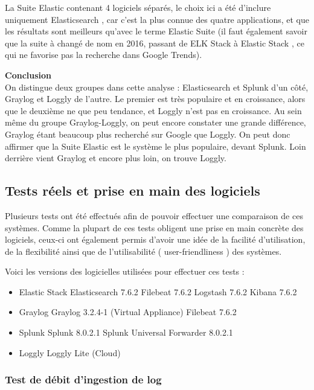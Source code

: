\documentclass[paper=a4, fontsize=11pt]{scrartcl}
\begin{document}
La Suite Elastic contenant 4 logiciels séparés, le choix ici a été d'inclure uniquement \og Elasticsearch \fg, car c'est la plus connue des quatre applications, et que les résultats sont meilleurs qu'avec le terme \og Elastic Suite \fg (il faut également savoir que la suite à changé de nom en 2016, passant de \og ELK Stack \fg à \og Elastic Stack \fg, ce qui ne favorise pas la recherche dans Google Trends).

\textbf{Conclusion} \\
On distingue deux groupes dans cette analyse : Elasticsearch et Splunk d'un côté, Graylog et Loggly de l'autre. Le premier est très populaire et en croissance, alors que le deuxième ne que peu tendance, et Loggly n'est pas en croissance. Au sein même du groupe Graylog-Loggly, on peut encore constater une grande différence, Graylog étant beaucoup plus recherché sur Google que Loggly. On peut donc affirmer que la Suite Elastic est le système le plus populaire, devant Splunk. Loin derrière vient Graylog et encore plus loin, on trouve Loggly.

\subsection{Tests réels et prise en main des logiciels}

Plusieurs tests ont été effectués afin de pouvoir effectuer une comparaison de ces systèmes. Comme la plupart de ces tests obligent une prise en main concrète des logiciels, ceux-ci ont également permis d'avoir une idée de la facilité d'utilisation, de la flexibilité ainsi que de l'utilisabilité ( \og user-friendliness \fg) des systèmes.

Voici les versions des logicielles utilisées pour effectuer ces tests :

\begin{itemize}
    \item Elastic Stack
    \subitem Elasticsearch 7.6.2
    \subitem Filebeat 7.6.2
    \subitem Logstash 7.6.2
    \subitem Kibana 7.6.2
    \item Graylog
    \subitem Graylog 3.2.4-1 (Virtual Appliance)
    \subitem Filebeat 7.6.2
    \item Splunk
    \subitem Splunk 8.0.2.1
    \subitem Splunk Universal Forwarder 8.0.2.1
    \item Loggly
    \subitem Loggly Lite (Cloud)
\end{itemize}

\subsubsection{Test de débit d'ingestion de log}
\end{document}
